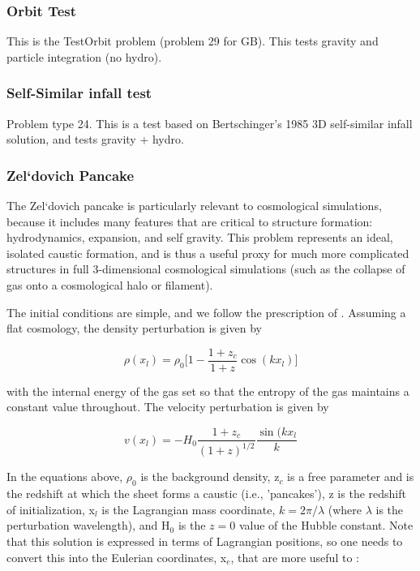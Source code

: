 \subsubsection{Orbit Test}
\label{sec.test.testorbit}
This is the TestOrbit problem (problem 29 for GB).  This tests gravity and particle integration (no hydro).

\subsubsection{Self-Similar infall test}
\label{sec.tests.infall}
Problem type 24.  This is a test based on Bertschinger's 1985 3D self-similar infall
solution, and tests gravity + hydro.

\subsubsection{Zel`dovich Pancake}
\label{sec.tests.pancake}

The Zel`dovich pancake \citep{1970A&A.....5...84Z} is particularly
relevant to cosmological simulations, because it includes many
features that are critical to structure formation: hydrodynamics,
expansion, and self gravity.  This problem represents an ideal,
isolated caustic formation, and is thus a useful proxy for much more
complicated structures in full 3-dimensional cosmological simulations
(such as the collapse of gas onto a cosmological halo or filament).

The initial conditions are simple, and we follow the prescription of
\citet{Anninos94}.  Assuming a flat cosmology, the density
perturbation is given by

\begin{equation}
\rho(x_l) = \rho_0 \big[ 1 - \frac{1+z_c}{1+z} \cos(k x_l) \big]
\end{equation}

with the internal energy of the gas set so that the entropy of the gas
maintains a constant value throughout.  The velocity perturbation is given by

\begin{equation}
v(x_l) = -H_0 \frac{1 + z_c}{(1+z)^{1/2}} \frac{\sin(k x_l}{k}
\end{equation}

In the equations above, $\rho_0$ is the background density, z$_c$ is a
free parameter and is the redshift at which the sheet forms a caustic
(i.e., 'pancakes'), z is the redshift of initialization, x$_l$ is the
Lagrangian mass coordinate, $k = 2 \pi / \lambda$ (where $\lambda$ is
the perturbation wavelength), and H$_0$ is the $z = 0$ value of the
Hubble constant.  Note that this solution is expressed in terms of
Lagrangian positions, so one needs to convert this into the Eulerian
coordinates, x$_e$, that are more useful to \enzo:

